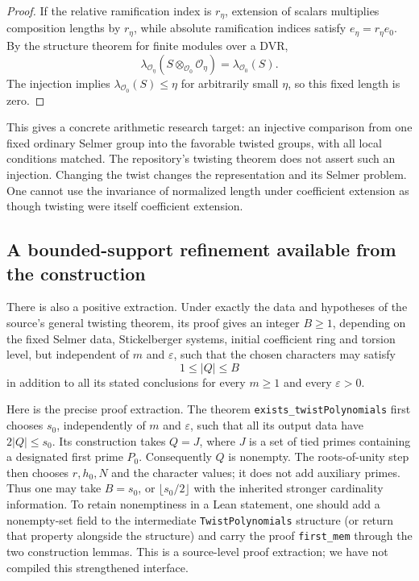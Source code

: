 \begin{proof}
If the relative ramification index is $r_\eta$, extension of scalars
multiplies composition lengths by $r_\eta$, while absolute
ramification indices satisfy $e_\eta=r_\eta e_0$. By the structure
theorem for finite modules over a DVR,
\[
 \lambda_{\mathcal O_\eta}
   (S\otimes_{\mathcal O_0}\mathcal O_\eta)
 =\lambda_{\mathcal O_0}(S).
\]
The injection implies $\lambda_{\mathcal O_0}(S)\leq\eta$ for
arbitrarily small $\eta$, so this fixed length is zero.
\end{proof}

This gives a concrete arithmetic research target: an injective
comparison from one fixed ordinary Selmer group into the favorable
twisted groups, with all local conditions matched. The repository's
twisting theorem does not assert such an injection. Changing the twist
changes the representation and its Selmer problem. One cannot use
the invariance of normalized length under coefficient extension as
though twisting were itself coefficient extension.

\subsection{A bounded-support refinement available from the construction}
\label{sec:bounded-twist-support}

There is also a positive extraction. Under exactly the data and
hypotheses of the source's general twisting theorem, its proof gives
an integer $B\geq1$, depending on the fixed Selmer data, Stickelberger
systems, initial coefficient ring and torsion level, but independent
of $m$ and $\varepsilon$, such that the chosen characters may satisfy
\[
 1\leq |Q|\leq B
\]
in addition to all its stated conclusions for every
$m\geq1$ and every $\varepsilon>0$.

Here is the precise proof extraction. The theorem
\texttt{exists\_twistPolynomials} first chooses $s_0$, independently of
$m$ and $\varepsilon$, such that all its output data have
$2|Q|\leq s_0$. Its construction takes $Q=J$, where $J$ is a set of
tied primes containing a designated first prime $P_0$. Consequently
$Q$ is nonempty. The roots-of-unity step then chooses $r,h_0,N$ and
the character values; it does not add auxiliary primes. Thus one may
take $B=s_0$, or $\lfloor s_0/2\rfloor$ with the inherited stronger
cardinality information. To retain nonemptiness in a Lean statement,
one should add a nonempty-set field to the intermediate
\texttt{TwistPolynomials} structure (or return that property alongside
the structure) and carry the proof \texttt{first\_mem} through the two
construction lemmas. This is a source-level proof extraction; we
have not compiled this strengthened interface.

